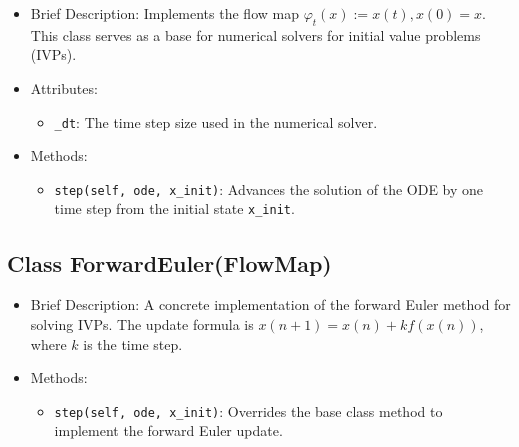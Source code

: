 \begin{itemize}
\item Brief Description: Implements the flow map $\varphi_t(x) := x(t), x(0) = x$. 
  This class serves as a base for numerical solvers for initial value problems (IVPs).
\item Attributes:
  \begin{itemize}
  \item \lstinline|_dt|: The time step size used in the numerical solver.
  \end{itemize}
\item Methods:
  \begin{itemize}
  \item \lstinline|step(self, ode, x_init)|: Advances the solution of the ODE by one time step from the initial state \lstinline|x_init|.
  \end{itemize}
\end{itemize}

\subsection{Class ForwardEuler(FlowMap)}

\begin{itemize}
\item Brief Description: A concrete implementation of the forward Euler method
 for solving IVPs.
 The update formula is $x(n+1) = x(n) + kf(x(n))$,
 where $k$ is the time step.
\item Methods:
  \begin{itemize}
  \item \lstinline|step(self, ode, x_init)|:
    Overrides the base class method to implement the forward Euler update.
  \end{itemize}
\end{itemize}



